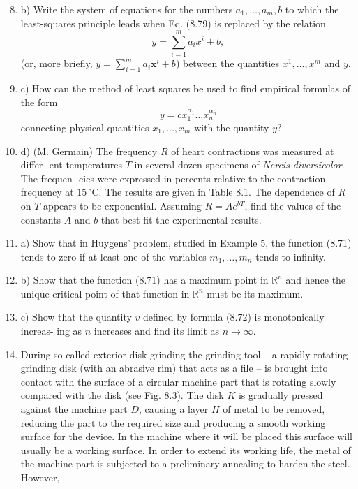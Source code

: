     \begin{enumerate}
        \setcounter{enumi}{7}
        \renewcommand{\theenumi}{\alph{enumi}}
        \item b) Write the system of equations for the numbers $a_1, \ldots, a_m, b$ to which the
        least-squares principle leads when Eq. (8.79) is replaced by the relation
        \[
        y = \sum_{i=1}^m a_i x^i + b,
        \]
        (or, more briefly, $y = \sum_{i=1}^m a_i \mathbf{x}^i + b$) between the quantities $x^1, \ldots, x^m$ and $y$.
        \item c) How can the method of least squares be used to find empirical formulas of
        the form
        \[
        y = c x_1^{\alpha_1} \ldots x_n^{\alpha_n}
        \]
        connecting physical quantities $x_1, \ldots, x_m$ with the quantity $y$?
        \item d) (M. Germain) The frequency $R$ of heart contractions was measured at differ-
        ent temperatures $T$ in several dozen specimens of \textit{Nereis diversicolor}. The frequen-
        cies were expressed in percents relative to the contraction frequency at $15\,^\circ\text{C}$. The
        results are given in Table 8.1.
        The dependence of $R$ on $T$ appears to be exponential. Assuming $R = Ae^{bT}$, find
        the values of the constants $A$ and $b$ that best fit the experimental results.
        \item a) Show that in Huygens' problem, studied in Example 5, the function (8.71)
        tends to zero if at least one of the variables $m_1, \ldots, m_n$ tends to infinity.
        \item b) Show that the function (8.71) has a maximum point in $\mathbb{R}^n$ and hence the
        unique critical point of that function in $\mathbb{R}^n$ must be its maximum.
        \item c) Show that the quantity $v$ defined by formula (8.72) is monotonically increas-
        ing as $n$ increases and find its limit as $n \to \infty$.
        \item During so-called exterior disk grinding the grinding tool -- a rapidly rotating
        grinding disk (with an abrasive rim) that acts as a file -- is brought into contact with
        the surface of a circular machine part that is rotating slowly compared with the disk
        (see Fig. 8.3).
        The disk $K$ is gradually pressed against the machine part $D$, causing a layer $H$ of
        metal to be removed, reducing the part to the required size and producing a smooth
        working surface for the device. In the machine where it will be placed this surface
        will usually be a working surface. In order to extend its working life, the metal of the
        machine part is subjected to a preliminary annealing to harden the steel. However,
    \end{enumerate}